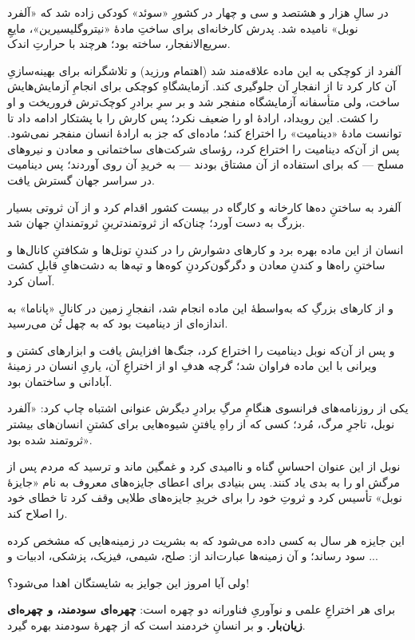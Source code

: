 
\begin{JTarjome}
در سالِ هزار و هشتصد و سی و چهار در کشورِ «سوئد» کودکی زاده شد که «آلفرد
نوبل» نامیده شد. پدرش کارخانه‌ای برای ساختِ مادهٔ «نیتروگلیسیرین»، مایعِ
سریع‌الانفجار، ساخته بود؛ هرچند با حرارتِ اندک.

آلفرد از کوچکی به این ماده علاقه‌مند شد (اهتمام ورزید) و تلاشگرانه برای
بهینه‌سازیِ آن کار کرد تا از انفجارِ آن جلوگیری کند. آزمایشگاهِ کوچکی برای
انجامِ آزمایش‌هایش ساخت، ولی متأسفانه آزمایشگاه منفجر شد و بر سرِ برادرِ
کوچک‌ترش فروریخت و او را کشت. این رویداد، ارادهٔ او را ضعیف نکرد؛ پس کارش را
با پشتکار ادامه داد تا توانست مادهٔ «دینامیت» را اختراع کند؛ ماده‌ای که جز به
ارادهٔ انسان منفجر نمی‌شود. پس از آن‌که دینامیت را اختراع کرد، رؤسای شرکت‌های
ساختمانی و معادن و نیروهای مسلح — که برای استفاده از آن مشتاق بودند — به
خریدِ آن روی آوردند؛ پس دینامیت در سراسر جهان گسترش یافت.
\end{JTarjome}

\begin{JTarjome}
آلفرد به ساختنِ ده‌ها کارخانه و کارگاه در بیست کشور اقدام کرد و از آن ثروتی
بسیار بزرگ به دست آورد؛ چنان‌که از ثروتمندترینِ ثروتمندانِ جهان شد.

انسان از این ماده بهره برد و کارهای دشوارش را در کندنِ تونل‌ها و شکافتنِ
کانال‌ها و ساختنِ راه‌ها و کندنِ معادن و دگرگون‌کردنِ کوه‌ها و تپه‌ها به
دشت‌هایِ قابلِ کشت آسان کرد.

و از کارهای بزرگِ که به‌واسطهٔ این ماده انجام شد، انفجارِ زمین در کانالِ
«پاناما» به اندازه‌ای از دینامیت بود که به چهل تُن می‌رسید.

و پس از آن‌که نوبل دینامیت را اختراع کرد، جنگ‌ها افزایش یافت و ابزارهای
کشتن و ویرانی با این ماده فراوان شد؛ گرچه هدفِ او از اختراعِ آن، یاریِ انسان
در زمینهٔ آبادانی و ساختمان بود.
\end{JTarjome}

\begin{JTarjome}
یکی از روزنامه‌های فرانسوی هنگامِ مرگِ برادرِ دیگرش عنوانی اشتباه چاپ کرد:
«آلفرد نوبل، تاجرِ مرگ، مُرد؛ کسی که از راهِ یافتنِ شیوه‌هایی برای کشتنِ
انسان‌های بیشتر ثروتمند شده بود».

نوبل از این عنوان احساسِ گناه و ناامیدی کرد و غمگین ماند و ترسید که مردم پس
از مرگش او را به بدی یاد کنند. پس بنیادی برای اعطای جایزه‌های معروف به نام
«جایزهٔ نوبل» تأسیس کرد و ثروتِ خود را برای خریدِ جایزه‌های طلایی وقف کرد تا
خطای خود را اصلاح کند.

این جایزه هر سال به کسی داده می‌شود که به بشریت در زمینه‌هایی که مشخص کرده
سود رساند؛ و آن زمینه‌ها عبارت‌اند از: صلح، شیمی، فیزیک، پزشکی، ادبیات و ...

ولی آیا امروز این جوایز به شایستگان اهدا می‌شود؟!

برای هر اختراعِ علمی و نوآوریِ فناورانه دو چهره است:
{\bfseries چهره‌ای سودمند، و چهره‌ای زیان‌بار.}
و بر انسانِ خردمند است که از چهرهٔ سودمند بهره گیرد.
\end{JTarjome}

